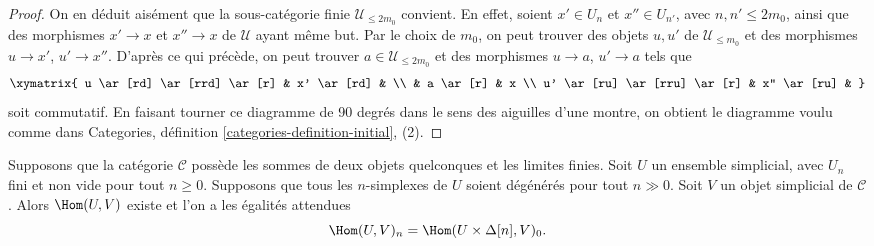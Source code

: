 \begin{proof}
\medskip\noindent
On en déduit aisément que la sous-catégorie finie
$\mathcal{U}_{\leq 2m_0}$ convient. En effet, soient
$x' \in U_n$ et $x'' \in U_{n'}$, avec $n, n' \leq 2m_0$, ainsi que
des morphismes $x' \to x$ et $x'' \to x$ de $\mathcal{U}$
ayant même but. Par le choix de $m_0$, on peut trouver des objets
$u, u'$ de $\mathcal{U}_{\leq m_0}$ et des morphismes
$u \to x'$, $u' \to x''$.
D'après ce qui précède, on peut trouver $a \in \mathcal{U}_{\leq 2m_0}$
et des morphismes $u \to a$, $u' \to a$ tels que
$$
\xymatrix{
u \ar[rd] \ar[rrd] \ar[r] & x' \ar[rd] & \\
& a \ar[r] & x \\
u' \ar[ru] \ar[rru] \ar[r] & x'' \ar[ru] &
}
$$
soit commutatif. En faisant tourner ce diagramme de 90 degrés dans le
sens des aiguilles d'une montre, on obtient le diagramme voulu comme
dans Categories, définition \ref{categories-definition-initial}, (2).
\end{proof}

\begin{lemma}
\label{lemma-exists-hom-from-simplicial-set-finite}
Supposons que la catégorie $\mathcal{C}$ possède les sommes de deux
objets quelconques et les limites finies. Soit $U$ un ensemble simplicial,
avec $U_n$ fini et non vide pour tout $n \geq 0$. Supposons que tous les
$n$-simplexes de $U$ soient dégénérés pour tout $n \gg 0$.
Soit $V$ un objet simplicial de $\mathcal{C}$.
Alors $\Hom(U, V)$ existe et l'on a les égalités attendues
$$
\Hom(U, V)_n = \Hom(U \times \Delta[n], V)_0.
$$
\end{lemma}

